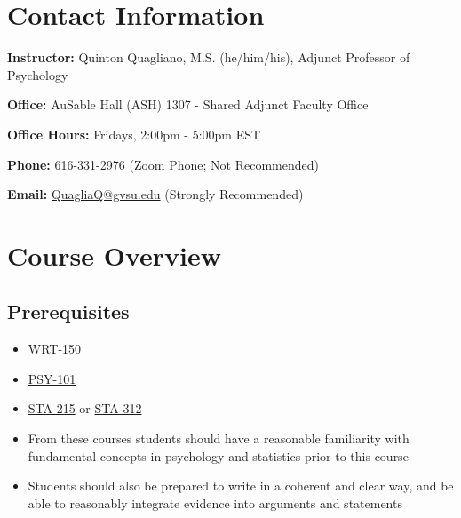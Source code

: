 \documentclass[
  12pt,
  letterpaper,
]{scrartcl}
\providecommand{\tightlist}{%
  \setlength{\itemsep}{0pt}\setlength{\parskip}{0pt}}\usepackage{longtable,booktabs,array}
\renewcommand*\contentsname{Table of contents}
\newcommand\contentsname{Table of contents}
\begin{document}


\pagestyle{scrheadings}

\frenchspacing %

\renewcommand*\contentsname{Table of Contents}
{
\hypersetup{linkcolor=}
\setcounter{tocdepth}{2}
\tableofcontents
}

\newpage{}

\section{Contact Information}\label{contact-information}

\textbf{Instructor:} Quinton Quagliano, M.S. (he/him/his), Adjunct
Professor of Psychology

\textbf{Office:} AuSable Hall (ASH) 1307 - Shared Adjunct Faculty Office

\textbf{Office Hours:} Fridays, 2:00pm - 5:00pm EST

\textbf{Phone:} 616-331-2976 (Zoom Phone; Not Recommended)

\textbf{Email:} \href{mailto:quagliaq@gvsu.edu}{QuagliaQ@gvsu.edu}
(Strongly Recommended)

\section{Course Overview}\label{course-overview}

\subsection{Prerequisites}\label{prerequisites}

\begin{itemize}
\tightlist
\item
  \href{https://www.gvsu.edu/catalog/course/wrt-150.htm}{WRT-150}
\item
  \href{https://www.gvsu.edu/catalog/course/psy-101.htm}{PSY-101}
\item
  \href{https://www.gvsu.edu/catalog/course/sta-215.htm}{STA-215} or
  \href{https://www.gvsu.edu/catalog/course/sta-312.htm}{STA-312}
\item
  From these courses students should have a reasonable familiarity with
  fundamental concepts in psychology and statistics prior to this course
\item
  Students should also be prepared to write in a coherent and clear way,
  and be able to reasonably integrate evidence into arguments and
  statements
\end{itemize}
\end{document}
